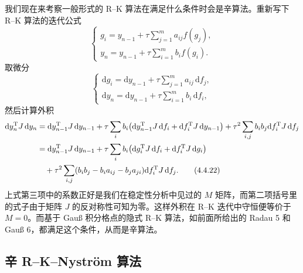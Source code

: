 我们现在来考察一般形式的 R--K 算法在满足什么条件时会是辛算法。重新写下 R--K 算法的迭代公式
\begin{equation}
\begin{cases}
\displaystyle g_i=y_{n-1}+\tau\sum_{j=1}^{m}a_{ij}f(g_j),\\[6pt]
\displaystyle y_n=y_{n-1}+\tau\sum_{i=1}^{m}b_i f(g_i).
\end{cases}
\tag{4.4.20}
\end{equation}
取微分
\begin{equation}
\begin{cases}
\displaystyle \mathrm dg_i=\mathrm dy_{n-1}+\tau\sum_{j=1}^{m}a_{ij}\,\mathrm df_j,\\[6pt]
\displaystyle \mathrm dy_n=\mathrm dy_{n-1}+\tau\sum_{i=1}^{m}b_i\,\mathrm df_i,
\end{cases}
\tag{4.4.21}
\end{equation}
然后计算外积
\begin{align}
\mathrm dy_n^{\mathrm T}J\,\mathrm dy_n
&=\mathrm dy_{n-1}^{\mathrm T}J\,\mathrm dy_{n-1}
 +\tau\sum_i b_i\bigl(\mathrm dy_{n-1}^{\mathrm T}J\,\mathrm df_i+\mathrm df_i^{\mathrm T}J\,\mathrm dy_{n-1}\bigr)
 +\tau^2\sum_{i,j}b_ib_j\mathrm df_i^{\mathrm T}J\,\mathrm df_j\notag\\
&=\mathrm dy_{n-1}^{\mathrm T}J\,\mathrm dy_{n-1}
 +\tau\sum_i b_i\bigl(\mathrm dg_i^{\mathrm T}J\,\mathrm df_i+\mathrm df_i^{\mathrm T}J\,\mathrm dg_i\bigr)\notag\\
&\quad+\tau^2\sum_{i,j}(b_ib_j-b_i a_{ij}-b_j a_{ji})\mathrm df_i^{\mathrm T}J\,\mathrm df_j.
\tag{4.4.22}
\end{align}
上式第三项中的系数正好是我们在稳定性分析中见过的 $M$ 矩阵，而第二项括号里的式子由于矩阵 $J$ 的反对称性可知为零。这样外积在 R--K 迭代中守恒便等价于 $M=0$。而基于 Gauß 积分格点的隐式 R--K 算法，如前面所给出的 Radau 5 和 Gauß 6，都满足这个条件，从而是辛算法。

\subsection{辛 R--K--Nyström 算法}

